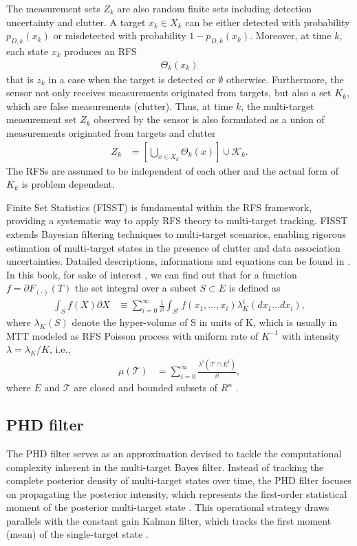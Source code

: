 The measurement sets $Z_k$ are also random finite sets including detection uncertainty and clutter. A target $x_k \in X_k$ can be either detected with probability $p_{D,k}(x_k)$ or misdetected with probability $1-p_{D,k}(x_k)$. Moreover, at time $k$, each state $x_k$ produces an RFS
\begin{align}
    \Theta_k(x_k)
\end{align}
that is ${z_k}$ in a case when the target is detected or $\emptyset$ otherwise. Furthermore, the sensor not only
receives measurements originated from targets, but also a set $K_k$, which are false measurements (clutter). Thus, at
time $k$, the multi-target measurement set $Z_k$ observed by the sensor is also formulated as a union of measurements
originated from targets and clutter
\begin{align}
    Z_k &= \left[ \bigcup_{x \in X_k} \Theta_k(x) \right] \cup \mathcal{K}_k. \label{eq:rfs_measurement_union}
\end{align}
The RFSs are assumed to be independent of each other and the actual form of $K_k$ is problem dependent.


Finite Set Statistics (FISST) is fundamental within the RFS framework, providing a systematic way to apply RFS theory
to multi-target tracking. FISST extends Bayesian filtering techniques to multi-target scenarios, enabling rigorous
estimation of multi-target states in the presence of clutter and data association uncertainties. Datailed
descriptions, informations and equations can be found in \cite{FISSTgoodman1997}. In this book, for sake of interest
, we can find out that for a function $f=\partial F_{(\cdot)}(T)$ the set integral over a subset $S \subset E$ is
defined as
\begin{align}
    \int_{S}f(X)\partial X &\equiv \sum_{i=0}^{\infty} \frac{1}{i!}\int_{S^i} f({x_1,\dots,x_i})\lambda_K^i(dx_1\dots dx_i),
\end{align}
where $\lambda_K(S)$ denote the hyper-volume of S in units of K, which is usually in MTT modeled as RFS Poisson process with uniform rate of $K^{-1}$ with intensity $\lambda = \lambda_K/K$, i.e.,
\begin{align}
    \mu(\mathcal{T}) &= \sum_{i=0}^{\infty} \frac{\lambda^i(\mathcal{T} \cap E^i)}{i!},
\end{align}
where $E$ and $\mathcal{T}$ are closed and bounded subsets of $R^n$ \cite{VoRFS2003}.

        \subsection{PHD filter}
\label{sec:phdfilter}
The PHD filter serves as an approximation devised to tackle the computational complexity inherent in the multi-target Bayes filter. Instead of tracking the complete posterior density of multi-target states over time, the PHD filter focuses on propagating the posterior intensity, which represents the first-order statistical moment of the posterior multi-target state \cite{mahler}. This operational strategy draws parallels with the constant gain Kalman filter, which tracks the first moment (mean) of the single-target state \cite{VoMaPHD2006}.

